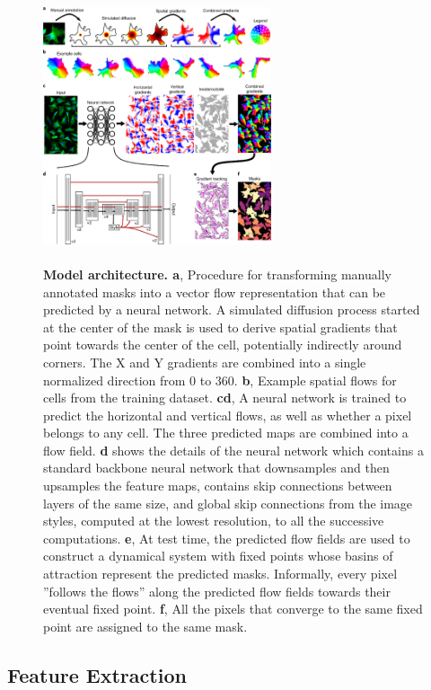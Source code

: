 \documentclass[10pt,twocolumn]{article}
\begin{document}
\begin{figure}[!htb]
\centering
\includegraphics[width=0.6\textwidth, height=8cm]{images/cellpose.png}
\caption{\textbf{Model architecture. a}, Procedure for transforming manually annotated masks into a vector flow representation that can be predicted
by a neural network. A simulated diffusion process started at the center of the mask is used to derive spatial gradients that point towards the
center of the cell, potentially indirectly around corners. The X and Y gradients are combined into a single normalized direction from 0 to 360.
\textbf{b}, Example spatial flows for cells from the training dataset. \textbf{cd}, A neural network is trained to predict the horizontal and vertical flows, as well
as whether a pixel belongs to any cell. The three predicted maps are combined into a flow field. \textbf{d} shows the details of the neural network
which contains a standard backbone neural network that downsamples and then upsamples the feature maps, contains skip connections
between layers of the same size, and global skip connections from the image styles, computed at the lowest resolution, to all the successive
computations. \textbf{e}, At test time, the predicted flow fields are used to construct a dynamical system with fixed points whose basins of attraction
represent the predicted masks. Informally, every pixel ”follows the flows” along the predicted flow fields towards their eventual fixed point. \textbf{f}, All
the pixels that converge to the same fixed point are assigned to the same mask.} 
\end{figure}

\subsection{Feature Extraction}
\end{document}
